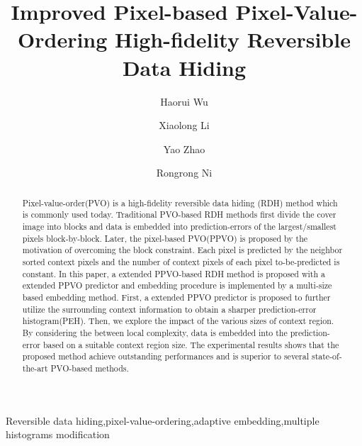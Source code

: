 \documentclass[review,3p,10pt,sort&compress]{elsarticle}
\begin{document}
\begin{frontmatter}

\title {Improved Pixel-based Pixel-Value-Ordering High-fidelity Reversible Data Hiding}

\author{Haorui Wu}

\author{Xiaolong Li}

\author{Yao Zhao}

\author{Rongrong Ni}

\address[mymainaddress]{Institute of Information Science, Beijing Jiaotong University, Beijing 100044, China}
\address[mysecondaryaddress]{Beijing Key Laboratory of Advanced Information Science and Network Technology, Beijing 100044, China}

\begin{abstract}
Pixel-value-order(PVO) is a high-fidelity reversible data hiding (RDH) method which is commonly used today. Traditional PVO-based RDH methods first divide the cover image into blocks and data is embedded into prediction-errors of the largest/smallest pixels block-by-block. Later, the pixel-based PVO(PPVO) is proposed by the motivation of overcoming the block constraint. Each pixel is predicted by the neighbor sorted context pixels and the number of context pixels of each pixel to-be-predicted is constant. In this paper, a extended PPVO-based RDH method is proposed with a extended PPVO predictor and embedding procedure is implemented by a multi-size based embedding method. First, a extended PPVO predictor is proposed to further utilize the surrounding context information to obtain a sharper prediction-error histogram(PEH). Then, we explore the impact of the various sizes of context region. By considering the between local complexity, data is embedded into the prediction-error based on a suitable context region size. The experimental results shows that the proposed method achieve outstanding performances and is superior to several state-of-the-art PVO-based methods.
\end{abstract}


\begin{keyword}
   Reversible data hiding\sep pixel-value-ordering\sep adaptive embedding\sep multiple histograms modification
\end{keyword}

\end{frontmatter}
\end{document}
